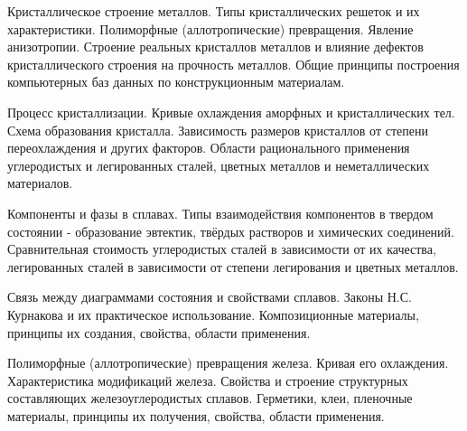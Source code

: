 \documentclass[
	14pt,
	a4paper,
	]
	{scrartcl}
\begin{document}
\shapk
{}
\setcounter{zad}{0}

\vfill
\z Кристаллическое строение металлов. Типы кристаллических решеток и их характеристики. Полиморфные (аллотропические) превращения. Явление анизотропии. Строение реальных кристаллов металлов и влияние дефектов кристаллического строения на прочность металлов.
 \vfill
\z Общие принципы построения компьютерных баз данных по конструкционным материалам. \vfill

\vfill

\newpage


\shapk
{}
\setcounter{zad}{0}

\vfill
\z Процесс кристаллизации. Кривые охлаждения аморфных и кристаллических тел. Схема образования кристалла. Зависимость размеров кристаллов от степени переохлаждения и других факторов.
 \vfill
\z Области рационального применения углеродистых и легированных сталей, цветных металлов и неметаллических материалов.
 \vfill

\vfill

\newpage


\shapk
{}
\setcounter{zad}{0}

\vfill
\z Компоненты и фазы в сплавах. Типы взаимодействия компонентов в твердом состоянии - образование эвтектик, твёрдых растворов и химических соединений.
 \vfill
\z Сравнительная стоимость углеродистых сталей в зависимости от их качества, легированных сталей в зависимости от степени легирования и цветных металлов.
 \vfill

\vfill

\newpage


\shapk
{}
\setcounter{zad}{0}

\vfill
\z Связь между диаграммами состояния и свойствами сплавов. Законы Н.С. Курнакова и их практическое использование.
 \vfill
\z Композиционные материалы, принципы их создания, свойства, области применения.
 \vfill

\vfill

\newpage


\shapk
{}
\setcounter{zad}{0}

\vfill
\z Полиморфные (аллотропические) превращения железа. Кривая его охлаждения. Характеристика модификаций железа. Свойства и строение структурных составляющих железоуглеродистых сплавов.
 \vfill
\z Герметики, клеи, пленочные материалы, принципы их получения, свойства, области применения.
 \vfill
\end{document}
